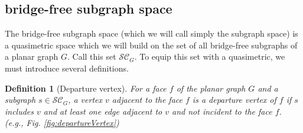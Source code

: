 \documentclass{article}
\newtheorem{definition}{Definition}[section]
\begin{document}
\subsection{bridge-free subgraph space}
The bridge-free subgraph space (which we will call simply the subgraph space) is a quasimetric space which we will build on the set of all bridge-free subgraphs of a planar graph $G$. Call this set $\mathcal{SC}_{G}$. To equip this set with a quasimetric, we must introduce several definitions. 

\begin{definition}[Departure vertex]
    For a face $f$ of the planar graph $G$ and a subgraph $s\in \mathcal{SC}_G$, a vertex $v$ adjacent to the face $f$ is a departure vertex of $f$ if $s$ includes $v$ and at least one edge adjacent to $v$ and not incident to the face $f$. (e.g., Fig. \ref{fig:departureVertex})
\end{definition}
\end{document}
